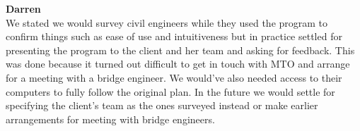 \documentclass[12pt, titlepage]{article}
\begin{document}
\noindent\textbf{Darren}\\
We stated we would survey civil engineers while they used the program to confirm things such as ease of use and intuitiveness but in practice settled for presenting the program to the client and her team and asking for feedback. This was done because it turned out difficult to get in touch with MTO and arrange for a meeting with a bridge engineer. We would've also needed access to their computers to fully follow the original plan. In the future we would settle for specifying the client's team as the ones surveyed instead or make earlier arrangements for meeting with bridge engineers.\\
\end{document}

